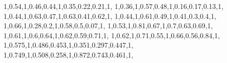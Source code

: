 \documentclass[
]{book}
\newenvironment{Shaded}{\begin{snugshade}}{\end{snugshade}}
\newcommand{\DecValTok}[1]{\textcolor[rgb]{0.00,0.00,0.81}{#1}}
\newcommand{\FloatTok}[1]{\textcolor[rgb]{0.00,0.00,0.81}{#1}}
\newcommand{\NormalTok}[1]{#1}
\begin{document}
\begin{Shaded}
\begin{Highlighting}[]
        \DecValTok{1}\NormalTok{,}\FloatTok{0.54}\NormalTok{,}\DecValTok{1}\NormalTok{,}\FloatTok{0.46}\NormalTok{,}\FloatTok{0.44}\NormalTok{,}\DecValTok{1}\NormalTok{,}\FloatTok{0.35}\NormalTok{,}\FloatTok{0.22}\NormalTok{,}\FloatTok{0.21}\NormalTok{,}\DecValTok{1}\NormalTok{,}
        \DecValTok{1}\NormalTok{,}\FloatTok{0.36}\NormalTok{,}\DecValTok{1}\NormalTok{,}\FloatTok{0.57}\NormalTok{,}\FloatTok{0.48}\NormalTok{,}\DecValTok{1}\NormalTok{,}\FloatTok{0.16}\NormalTok{,}\FloatTok{0.17}\NormalTok{,}\FloatTok{0.13}\NormalTok{,}\DecValTok{1}\NormalTok{,}
        \DecValTok{1}\NormalTok{,}\FloatTok{0.44}\NormalTok{,}\DecValTok{1}\NormalTok{,}\FloatTok{0.63}\NormalTok{,}\FloatTok{0.47}\NormalTok{,}\DecValTok{1}\NormalTok{,}\FloatTok{0.63}\NormalTok{,}\FloatTok{0.41}\NormalTok{,}\FloatTok{0.62}\NormalTok{,}\DecValTok{1}\NormalTok{,}
        \DecValTok{1}\NormalTok{,}\FloatTok{0.44}\NormalTok{,}\DecValTok{1}\NormalTok{,}\FloatTok{0.61}\NormalTok{,}\FloatTok{0.49}\NormalTok{,}\DecValTok{1}\NormalTok{,}\FloatTok{0.41}\NormalTok{,}\FloatTok{0.3}\NormalTok{,}\FloatTok{0.4}\NormalTok{,}\DecValTok{1}\NormalTok{,}
        \DecValTok{1}\NormalTok{,}\FloatTok{0.66}\NormalTok{,}\DecValTok{1}\NormalTok{,}\FloatTok{0.28}\NormalTok{,}\FloatTok{0.2}\NormalTok{,}\DecValTok{1}\NormalTok{,}\FloatTok{0.58}\NormalTok{,}\FloatTok{0.5}\NormalTok{,}\FloatTok{0.07}\NormalTok{,}\DecValTok{1}\NormalTok{,}
        \DecValTok{1}\NormalTok{,}\FloatTok{0.53}\NormalTok{,}\DecValTok{1}\NormalTok{,}\FloatTok{0.81}\NormalTok{,}\FloatTok{0.67}\NormalTok{,}\DecValTok{1}\NormalTok{,}\FloatTok{0.7}\NormalTok{,}\FloatTok{0.63}\NormalTok{,}\FloatTok{0.69}\NormalTok{,}\DecValTok{1}\NormalTok{,}
        \DecValTok{1}\NormalTok{,}\FloatTok{0.61}\NormalTok{,}\DecValTok{1}\NormalTok{,}\FloatTok{0.6}\NormalTok{,}\FloatTok{0.64}\NormalTok{,}\DecValTok{1}\NormalTok{,}\FloatTok{0.62}\NormalTok{,}\FloatTok{0.59}\NormalTok{,}\FloatTok{0.71}\NormalTok{,}\DecValTok{1}\NormalTok{,}
        \DecValTok{1}\NormalTok{,}\FloatTok{0.62}\NormalTok{,}\DecValTok{1}\NormalTok{,}\FloatTok{0.71}\NormalTok{,}\FloatTok{0.55}\NormalTok{,}\DecValTok{1}\NormalTok{,}\FloatTok{0.66}\NormalTok{,}\FloatTok{0.56}\NormalTok{,}\FloatTok{0.84}\NormalTok{,}\DecValTok{1}\NormalTok{,}
        \DecValTok{1}\NormalTok{,}\FloatTok{0.575}\NormalTok{,}\DecValTok{1}\NormalTok{,}\FloatTok{0.486}\NormalTok{,}\FloatTok{0.453}\NormalTok{,}\DecValTok{1}\NormalTok{,}\FloatTok{0.351}\NormalTok{,}\FloatTok{0.297}\NormalTok{,}\FloatTok{0.447}\NormalTok{,}\DecValTok{1}\NormalTok{,}
        \DecValTok{1}\NormalTok{,}\FloatTok{0.749}\NormalTok{,}\DecValTok{1}\NormalTok{,}\FloatTok{0.508}\NormalTok{,}\FloatTok{0.258}\NormalTok{,}\DecValTok{1}\NormalTok{,}\FloatTok{0.872}\NormalTok{,}\FloatTok{0.743}\NormalTok{,}\FloatTok{0.461}\NormalTok{,}\DecValTok{1}\NormalTok{,}

\end{Highlighting}
\end{Shaded}
\end{document}
